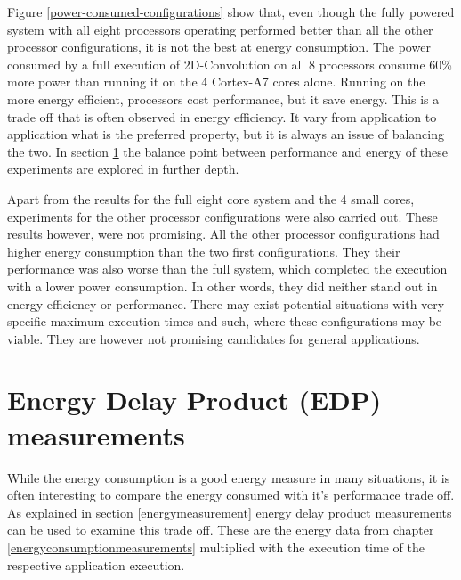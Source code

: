 Figure \ref{power-consumed-configurations} show that, even though the fully powered system with all eight processors operating performed better than all the other processor configurations, it is not the best at energy consumption.
The power consumed by a full execution of 2D-Convolution on all 8 processors consume 60\% more power than running it on the 4 Cortex-A7 cores alone.
Running on the more energy efficient, processors cost performance, but it save energy.
This is a trade off that is often observed in energy efficiency.
It vary from application to application what is the preferred property, but it is always an issue of balancing the two.
In section \ref{EDP} the balance point between performance and energy of these experiments are explored in further depth.

Apart from the results for the full eight core system and the 4 small cores, experiments for the other processor configurations were also carried out.
These results however, were not promising.
All the other processor configurations had higher energy consumption than the two first configurations.
They their performance was also worse than the full system, which completed the execution with a lower power consumption.
In other words, they did neither stand out in energy efficiency or performance.
There may exist potential situations with very specific maximum execution times and such, where these configurations may be viable.
They are however not promising candidates for general applications.

\section{Energy Delay Product (EDP) measurements} \label{EDP}
While the energy consumption is a good energy measure in many situations, it is often interesting to compare the energy consumed with it's performance trade off.
As explained in section \ref{energymeasurement} energy delay product measurements can be used to examine this trade off.
These are the energy data from chapter \ref{energyconsumptionmeasurements} multiplied with the execution time of the respective application execution.


